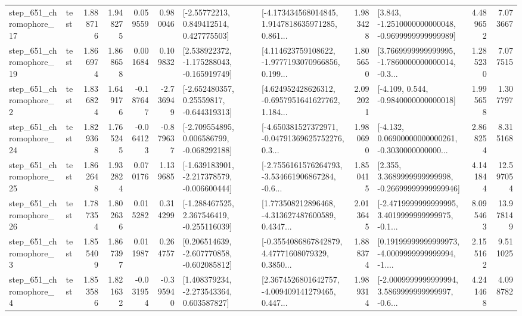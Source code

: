 \begin{tabular}{llrrrrllrlrr}
  step\_651\_chromophore\_17 &      test &      1.888716 &    1.948275 &      0.059559 &  0.980046 &     [-2.55772213, 0.849412514, 0.427775503] &  [-4.173434568014845, 1.9147818635971285, 0.861... &       1.983428 &  [3.843, -1.2510000000000048, -0.9699999999999989] &            4.489652 &          7.073667 \\
  step\_651\_chromophore\_19 &      test &      1.866974 &    1.868658 &      0.001684 &  0.109832 &   [2.538922372, -1.175288043, -0.165919749] &  [4.114623759108622, -1.9777193070966856, 0.199... &       1.805650 &  [3.7669999999999995, -1.7860000000000014, -0.3... &            1.285230 &          7.077515 \\
   step\_651\_chromophore\_2 &      test &      1.836824 &    1.649176 &     -0.187647 & -2.736949 &    [-2.652480357, 0.25559817, -0.644319313] &  [4.624952428626312, -0.6957951641627762, 1.184... &       2.092021 &               [-4.109, 0.544, -0.9840000000000018] &            1.995658 &          1.307797 \\
  step\_651\_chromophore\_24 &      test &      1.829368 &    1.765245 &     -0.064123 & -0.879637 &   [-2.709554895, 0.006586799, -0.068292188] &  [-4.650381527372971, -0.04791369625752276, 0.3... &       1.980690 &  [-4.132, 0.06900000000000261, -0.3030000000000... &            2.868254 &          8.315168 \\
  step\_651\_chromophore\_25 &      test &      1.862648 &    1.932824 &      0.070176 &  1.139685 &  [-1.639183901, -2.217378579, -0.006600444] &  [-2.7556161576264793, -3.534661906867284, -0.6... &       1.850415 &  [2.355, 3.3689999999999998, -0.26699999999999946] &            4.141844 &         12.597054 \\
  step\_651\_chromophore\_26 &      test &      1.787354 &    1.802636 &      0.015282 &  0.314299 &   [-1.288467525, 2.367546419, -0.255116039] &  [1.773508212896468, -4.313627487600589, 0.4347... &       2.013645 &  [-2.4719999999999995, 3.4019999999999975, -0.1... &            8.095463 &         13.978149 \\
   step\_651\_chromophore\_3 &      test &      1.855409 &    1.867397 &      0.011987 &  0.264757 &   [0.206514639, -2.607770858, -0.602085812] &  [-0.3554086867842879, 4.47771608079329, 0.3850... &       1.888374 &  [0.19199999999999973, -4.0009999999999994, -1.... &            2.155162 &          9.511025 \\
   step\_651\_chromophore\_4 &      test &      1.853586 &    1.821632 &     -0.031954 & -0.395940 &    [1.408379234, -2.273543364, 0.603587827] &  [2.3674526801642757, -4.009409141279465, 0.447... &       1.989314 &  [-2.0009999999999994, 3.5869999999999997, -0.6... &            4.241468 &          4.098782 \\

\end{tabular}
